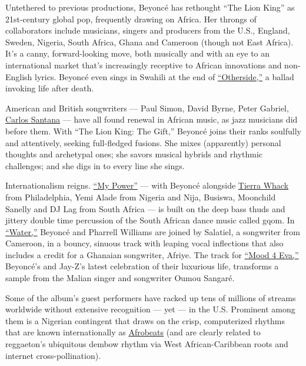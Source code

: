 Untethered to previous productions, Beyoncé has rethought ``The Lion
King'' as 21st-century global pop, frequently drawing on Africa. Her
throngs of collaborators include musicians, singers and producers from
the U.S., England, Sweden, Nigeria, South Africa, Ghana and Cameroon
(though not East Africa). It's a canny, forward-looking move, both
musically and with an eye to an international market that's increasingly
receptive to African innovations and non-English lyrics. Beyoncé even
sings in Swahili at the end of
\href{https://www.youtube.com/watch?v=PaMbTX-yDT0}{``Otherside,''} a
ballad invoking life after death.

American and British songwriters --- Paul Simon, David Byrne, Peter
Gabriel,
\href{https://www.nytimes.com/2019/06/25/arts/music/santana-buika-africa-speaks.html}{Carlos
Santana} --- have all found renewal in African music, as jazz musicians
did before them. With ``The Lion King: The Gift,'' Beyoncé joins their
ranks soulfully and attentively, seeking full-fledged fusions. She mixes
(apparently) personal thoughts and archetypal ones; she savors musical
hybrids and rhythmic challenges; and she digs in to every line she
sings.

Internationalism reigns.
\href{https://www.youtube.com/watch?v=V_ZsbqSg4aE}{``My Power''} ---
with Beyoncé alongside
\href{https://www.nytimes.com/2018/06/06/arts/music/tierra-whack-whack-world-interview.html}{Tierra
Whack} from Philadelphia, Yemi Alade from Nigeria and Nija, Busiswa,
Moonchild Sanelly and DJ Lag from South Africa --- is built on the deep
bass thuds and jittery double time percussion of the South African dance
music called gqom. In
\href{https://www.youtube.com/watch?v=essike_sirI}{``Water,''} Beyoncé
and Pharrell Williams are joined by Salatiel, a songwriter from
Cameroon, in a bouncy, sinuous track with leaping vocal inflections that
also includes a credit for a Ghanaian songwriter, Afriye. The track for
\href{https://www.youtube.com/watch?v=i978rjXw3P0}{``Mood 4 Eva,''}
Beyoncé's and Jay-Z's latest celebration of their luxurious life,
transforms a sample from the Malian singer and songwriter Oumou Sangaré.

Some of the album's guest performers have racked up tens of millions of
streams worldwide without extensive recognition --- yet --- in the U.S.
Prominent among them is a Nigerian contingent that draws on the crisp,
computerized rhythms that are known internationally as
\href{https://www.nytimes.com/2017/06/03/world/africa/nigeria-lagos-afrobeats-music-piracy-seyi-shay.html}{Afrobeats}
(and are clearly related to reggaeton's ubiquitous dembow rhythm via
West African-Caribbean roots and internet cross-pollination).

